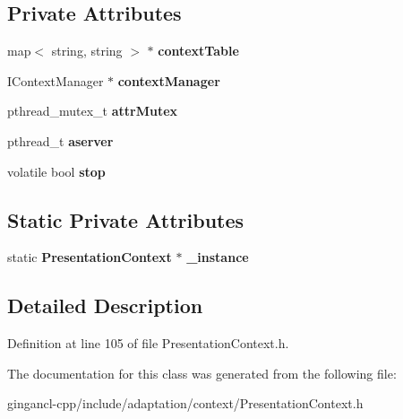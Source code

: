 \subsection*{Private Attributes}
\begin{CompactItemize}
\item 
map$<$ string, string $>$ $\ast$ {\bf contextTable}\label{classbr_1_1pucrio_1_1telemidia_1_1ginga_1_1ncl_1_1adaptation_1_1context_1_1PresentationContext_73fcc3745944c8364fdfbb3448280461}

\item 
IContextManager $\ast$ {\bf contextManager}\label{classbr_1_1pucrio_1_1telemidia_1_1ginga_1_1ncl_1_1adaptation_1_1context_1_1PresentationContext_109444b749680d2699b9e24a25887635}

\item 
pthread\_\-mutex\_\-t {\bf attrMutex}\label{classbr_1_1pucrio_1_1telemidia_1_1ginga_1_1ncl_1_1adaptation_1_1context_1_1PresentationContext_6c2c6df0dc027a135de92890035bc3d0}

\item 
pthread\_\-t {\bf aserver}\label{classbr_1_1pucrio_1_1telemidia_1_1ginga_1_1ncl_1_1adaptation_1_1context_1_1PresentationContext_785b719474ed06c7b3198cdd83ed6db5}

\item 
volatile bool {\bf stop}\label{classbr_1_1pucrio_1_1telemidia_1_1ginga_1_1ncl_1_1adaptation_1_1context_1_1PresentationContext_cb99505dbfaf7824f8725dff90d47ca8}

\end{CompactItemize}
\subsection*{Static Private Attributes}
\begin{CompactItemize}
\item 
static {\bf PresentationContext} $\ast$ {\bf \_\-instance}\label{classbr_1_1pucrio_1_1telemidia_1_1ginga_1_1ncl_1_1adaptation_1_1context_1_1PresentationContext_ce09f581dc9bead13680892d18db9a60}

\end{CompactItemize}


\subsection{Detailed Description}




Definition at line 105 of file PresentationContext.h.

The documentation for this class was generated from the following file:\begin{CompactItemize}
\item 
gingancl-cpp/include/adaptation/context/PresentationContext.h\end{CompactItemize}
